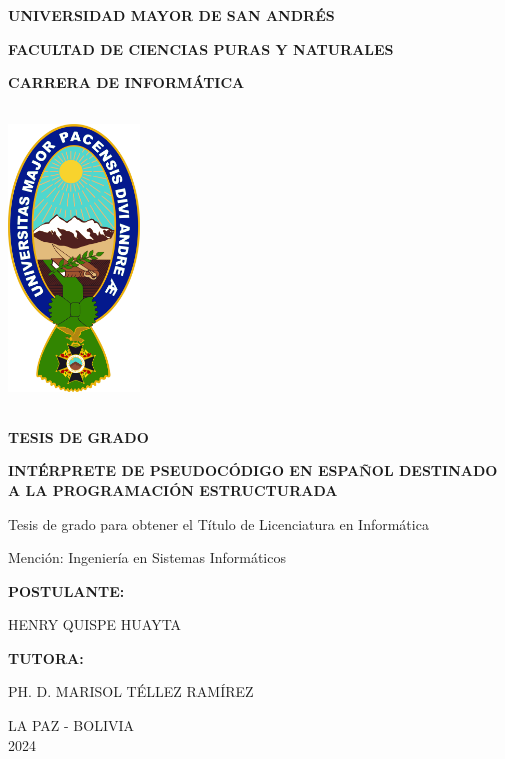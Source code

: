 \begin{titlepage}
  \centering
  {\fontsize{20}{0} \textbf{UNIVERSIDAD MAYOR DE SAN ANDRÉS}}\\
  {\fontsize{16}{0} \textbf{FACULTAD DE CIENCIAS PURAS Y NATURALES}\par}
  {\fontsize{16}{0} \textbf{CARRERA DE INFORMÁTICA}\par}
  \vspace{1cm}
  \includegraphics[height=8cm, width=3.5cm]{images/umsa.png}\par
  {\fontsize{12}{0} \textbf{TESIS DE GRADO}\par}
  {\fontsize{16}{0} \textbf{INTÉRPRETE DE PSEUDOCÓDIGO EN ESPAÑOL DESTINADO A LA PROGRAMACIÓN ESTRUCTURADA}\par}
  {\fontsize{11}{0} Tesis de grado para obtener el Título de Licenciatura en Informática\par}
  {\fontsize{11}{0} Mención: Ingeniería en Sistemas Informáticos\par}
  \vspace{2em}
  {\fontsize{14}{0} \textbf{POSTULANTE:}}
  {\fontsize{16}{0} HENRY QUISPE HUAYTA\par}
  {\fontsize{12}{0} \textbf{TUTORA:}}
  {\fontsize{14}{0} PH. D. MARISOL TÉLLEZ RAMÍREZ\par}
  \vspace{2em}
  {\fontsize{12}{0} LA PAZ - BOLIVIA\\ 2024\par}
\end{titlepage}